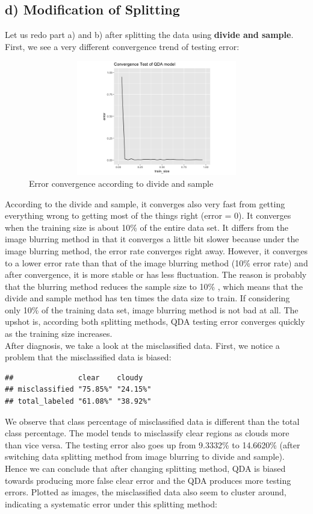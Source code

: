 \documentclass[jou]{apa}%
\begin{document}
\subsection{d) Modification of Splitting}
Let us redo part a) and b) after splitting the data using \textbf{divide and sample}. First, we see a very different convergence trend of testing error:
\begin{figure}[H]\hspace*{-2cm} \centering\includegraphics[width=12cm, height = 5cm]{convergeDivideSample}\caption{Error convergence according to divide and sample}\end{figure}
According to the divide and sample, it converges also very fast from getting everything wrong to getting most of the things right (error = 0). It converges when the training size is about 10\% of the entire data set. It differs from the image blurring method in that it converges a little bit slower because under the image blurring method, the error rate converges right away. However, it converges to a lower error rate than that of the image blurring method (10\% error rate) and after convergence, it is more stable or has less fluctuation. The reason is probably that the blurring method reduces the sample size to 10\% , which means that the divide and sample method has ten times the data size to train. If considering only 10\% of the training data set, image blurring method is not bad at all. The upshot is, according both splitting methods, QDA testing error converges quickly as the training size increases.\\
\indent After diagnosis, we take a look at the misclassified data. First, we notice a problem that the misclassified data is biased:
\begin{verbatim}
##               clear    cloudy  
## misclassified "75.85%" "24.15%"
## total_labeled "61.08%" "38.92%"
\end{verbatim} 
We observe that class percentage of misclassified data is different than the total class percentage. The model tends to misclassify clear regions as clouds more than vice versa. The testing error also goes up from 9.3332\% to 14.6620\% (after switching data splitting method from image blurring to divide and sample). Hence we can conclude that after changing splitting method, QDA is biased towards producing more false clear error and the QDA produces more testing errors. Plotted as images, the misclassified data also seem to cluster around, indicating a systematic error under this splitting method:
\end{document}
